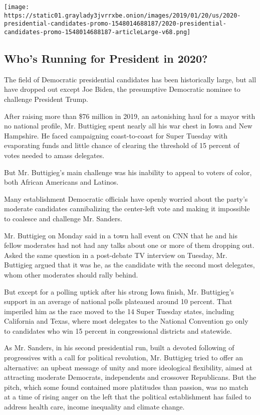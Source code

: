 \href{https://www.nytimes3xbfgragh.onion/interactive/2019/us/politics/2020-presidential-candidates.html}{}

\texttt{[image: https://static01.graylady3jvrrxbe.onion/images/2019/01/20/us/2020-presidential-candidates-promo-1548014688187/2020-presidential-candidates-promo-1548014688187-articleLarge-v68.png]}

\hypertarget{whos-running-for-president-in-2020}{%
\subsection{Who's Running for President in
2020?}\label{whos-running-for-president-in-2020}}

The field of Democratic presidential candidates has been historically
large, but all have dropped out except Joe Biden, the presumptive
Democratic nominee to challenge President Trump.

After raising more than \$76 million in 2019, an astonishing haul for a
mayor with no national profile, Mr. Buttigieg spent nearly all his war
chest in Iowa and New Hampshire. He faced campaigning coast-to-coast for
Super Tuesday with evaporating funds and little chance of clearing the
threshold of 15 percent of votes needed to amass delegates.

But Mr. Buttigieg's main challenge was his inability to appeal to voters
of color, both African Americans and Latinos.

Many establishment Democratic officials have openly worried about the
party's moderate candidates cannibalizing the center-left vote and
making it impossible to coalesce and challenge Mr. Sanders.

Mr. Buttigieg on Monday said in a town hall event on CNN that he and his
fellow moderates had not had any talks about one or more of them
dropping out. Asked the same question in a post-debate TV interview on
Tuesday, Mr. Buttigieg argued that it was he, as the candidate with the
second most delegates, whom other moderates should rally behind.

But except for a polling uptick after his strong Iowa finish, Mr.
Buttigieg's support in an average of national polls plateaued around 10
percent. That imperiled him as the race moved to the 14 Super Tuesday
states, including California and Texas, where most delegates to the
National Convention go only to candidates who win 15 percent in
congressional districts and statewide.

As Mr. Sanders, in his second presidential run, built a devoted
following of progressives with a call for political revolution, Mr.
Buttigieg tried to offer an alternative: an upbeat message of unity and
more ideological flexibility, aimed at attracting moderate Democrats,
independents and crossover Republicans. But the pitch, which some found
contained more platitudes than passion, was no match at a time of rising
anger on the left that the political establishment has failed to address
health care, income inequality and climate change.

